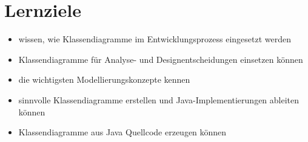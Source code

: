 \section{Lernziele}
\begin{itemize}
    \item wissen, wie Klassendiagramme im Entwicklungsprozess eingesetzt werden
    \item Klassendiagramme für Analyse- und Designentscheidungen einsetzen können
    \item die wichtigsten Modellierungskonzepte kennen
    \item sinnvolle Klassendiagramme erstellen und Java-Implementierungen ableiten können
    \item Klassendiagramme aus Java Quellcode erzeugen können
\end{itemize}